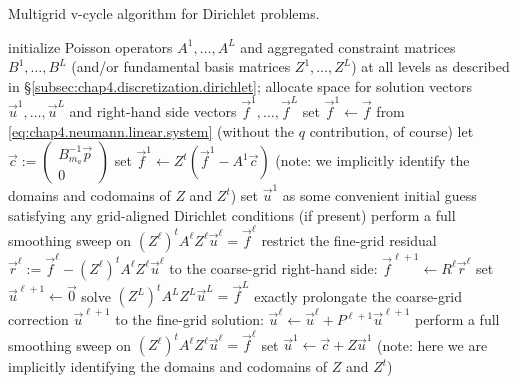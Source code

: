 \begin{algorithm}[htbp]
\caption{Multigrid v-cycle algorithm for Dirichlet problems.}
\label{alg:chap4.multigrid.dirichlet.vcycle}
\begin{algorithmic}[1]
\STATE initialize Poisson operators $A^1, \dotsc, A^L$ and aggregated constraint matrices $B^1, \dotsc, B^L$ (and/or fundamental basis matrices $Z^1, \dotsc, Z^L$) at all levels as described in \S\ref{subsec:chap4.discretization.dirichlet}; allocate space for solution vectors $\vec{u}^1, \dotsc, \vec{u}^L$ and right-hand side vectors $\vec{f}^1, \dotsc, \vec{f}^L$
\STATE set $\vec{f}^1 \leftarrow \vec{f}$ from \eqref{eq:chap4.neumann.linear.system} (without the $q$ contribution, of course)
\STATE let $\vec{c} := \begin{pmatrix} B_{m_a}^{-1} \vec{p} \\ 0 \end{pmatrix}$ 
\STATE set $\vec{f}^1 \leftarrow Z^t \left( \vec{f}^1 - A^1 \vec{c} \right)$ (note: we implicitly identify the domains and codomains of $Z$ and $Z^t$)
\STATE set $\vec{u}^1$ as some convenient initial guess satisfying any grid-aligned Dirichlet conditions (if present)
    \STATE perform a full smoothing sweep on $(Z^{\ell})^t A^{\ell} Z^{\ell} \vec{u}^{\ell} = \vec{f}^{\ell}$ 
    \STATE restrict the fine-grid residual $\vec{r}^{\ell} := \vec{f}^{\ell} - (Z^{\ell})^t A^{\ell} Z^{\ell} \vec{u}^{\ell}$ to the coarse-grid right-hand side: $\vec{f}^{\ell+1} \leftarrow R^{\ell} \vec{r}^{\ell}$ 
    \STATE set $\vec{u}^{\ell+1} \leftarrow \vec{0}$
\ENDFOR
\STATE solve $(Z^L)^t A^L Z^L \vec{u}^L = \vec{f}^L$ exactly 
    \STATE prolongate the coarse-grid correction $\vec{u}^{\ell+1}$ to the fine-grid solution: $\vec{u}^{\ell} \leftarrow \vec{u}^{\ell} + P^{\ell+1} \vec{u}^{\ell+1}$ 
    \STATE perform a full smoothing sweep on $(Z^{\ell})^t A^{\ell} Z^{\ell} \vec{u}^{\ell} = \vec{f}^{\ell}$ 
\ENDFOR
\STATE set $\vec{u}^1 \leftarrow \vec{c} + Z \vec{u}^1$ (note: here we are implicitly identifying the domains and codomains of $Z$ and $Z^t$)
\end{algorithmic}
\end{algorithm}

